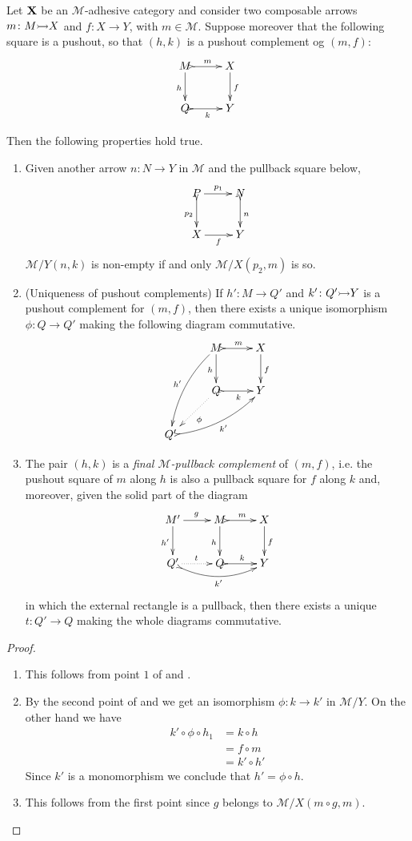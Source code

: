 \begin{corollary}\label{lem:radj} Let $\textbf {\textup{X}}$ be an $\mathcal{M}$-adhesive category and consider two composable arrows $m\colon M \mto X$  and $f\colon X\to Y$, with $m\in \mathcal{M}$. Suppose moreover that the following square is a pushout, so that $(h,k)$ is a pushout complement og $(m,f)$:
	\[\xymatrix{M \ar@{>->}[r]^{m}\ar[d]_{h}& X \ar[d]^{f} \\Q\ar@{>->}[r]_{k}&Y}\]
	
Then the following properties hold true.
\begin{enumerate}
	\item  Given another arrow $n\colon N\to Y$ in $\mathcal{M}$ and the pullback square below,
	\[\xymatrix{P \ar[r]^{p_1} \ar@{>->}[d]_{p_2}& N \ar@{>->}[d]^{n}\\X \ar[r]_f&Y}\]
	$\mathcal{M}/Y(n, k)$ is non-empty  if and only $\mathcal{M}/X(p_2, m)$ is so.
	\item (Uniqueness of pushout complements) If $h'\colon M\to Q' $ and $k'\colon Q'\mto Y$ is a pushout complement for $(m,f)$, then there exists a unique isomorphism $\phi\colon Q\to Q'$ making the following diagram commutative.
	\[\xymatrix{&M \ar@{>->}[r]^{m} \ar[d]_{h} \ar@/_.3cm/[ddl]_{h'}& X \ar[d]^{f} \\ &Q \ar@{.>}[dl]^{\phi} \ar@{>->}[r]_{k} & Y \\ Q' \ar@{>->}@/_.3cm/[urr]_{k'}}\]
	\item The pair $(h,k)$ is a \emph{final $\mathcal{M}$-pullback complement} of $(m,f)$, i.e. the pushout square of $m$ along $h$ is also a pullback square for $f$ along $k$ and, moreover, given the solid part of the diagram
	\[\xymatrix{M' \ar[r]^{g}\ar[d]_{h'} & M \ar@{>->}[r]^{m}\ar[d]_{h}& X \ar[d]^{f}  \\  Q' \ar@{.>}[r]^{t} \ar@/_.4cm/@{>->}[rr]_{k'}&Q\ar@{>->}[r]^{k}&Y}\]
	in which the external rectangle is a pullback, then there exists a unique $t\colon Q'\to Q$ making the whole diagrams commutative.
\end{enumerate}
\end{corollary}
\begin{proof}
	\begin{enumerate}
		\item  This follows from point $1$ of  and .
		\item  By the second point  of  and  we get an isomorphism $\phi:k\to k'$ in $\mathcal{M}/Y$. On the other hand we have
		\begin{align*}
			k'\circ \phi \circ  h_1&=k\circ h\\&=f\circ m\\&= k'\circ h'
		\end{align*}
		Since $k'$ is a monomorphism we conclude that $h'=\phi\circ h$.
		\item  This follows from the first point since $g$ belongs to $\mathcal{M}/X(m\circ g, m)$. \qedhere 
	\end{enumerate}
\end{proof}

